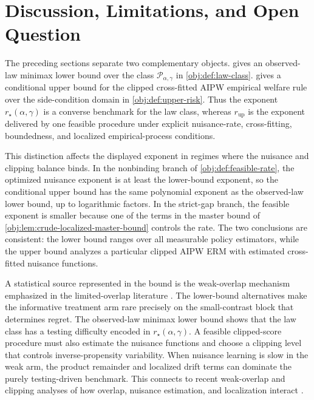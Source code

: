 \section{Discussion, Limitations, and Open Question}

The preceding sections separate two complementary objects.   gives an observed-law minimax lower bound over the class \(\mathcal P_{\alpha,\gamma}\) in \cref{obj:def:law-class}.   gives a conditional upper bound for the clipped cross-fitted AIPW empirical welfare rule over the side-condition domain in \cref{obj:def:upper-risk}.  Thus the exponent \(r_\star(\alpha,\gamma)\) is a converse benchmark for the law class, whereas \(r_{\mathrm{up}}\) is the exponent delivered by one feasible procedure under explicit nuisance-rate, cross-fitting, boundedness, and localized empirical-process conditions.

This distinction affects the displayed exponent in regimes where the nuisance and clipping balance binds.  In the nonbinding branch of \cref{obj:def:feasible-rate}, the optimized nuisance exponent is at least the lower-bound exponent, so the conditional upper bound has the same polynomial exponent as the observed-law lower bound, up to logarithmic factors.  In the strict-gap branch, the feasible exponent is smaller because one of the terms in the master bound of \cref{obj:lem:crude-localized-master-bound} controls the rate.  The two conclusions are consistent: the lower bound ranges over all measurable policy estimators, while the upper bound analyzes a particular clipped AIPW ERM with estimated cross-fitted nuisance functions.

A statistical source represented in the bound is the weak-overlap mechanism emphasized in the limited-overlap literature \citep{Li2016,DAmour2017,BenMichael2022,Hill2024,Susmann2025}.  The lower-bound alternatives make the informative treatment arm rare precisely on the small-contrast block that determines regret.  The observed-law minimax lower bound shows that the law class has a testing difficulty encoded in \(r_\star(\alpha,\gamma)\).  A feasible clipped-score procedure must also estimate the nuisance functions and choose a clipping level that controls inverse-propensity variability.  When nuisance learning is slow in the weak arm, the product remainder and localized drift terms can dominate the purely testing-driven benchmark.  This connects to recent weak-overlap and clipping analyses of how overlap, nuisance estimation, and localization interact \citep{Zhao2023,Liu2026}.

